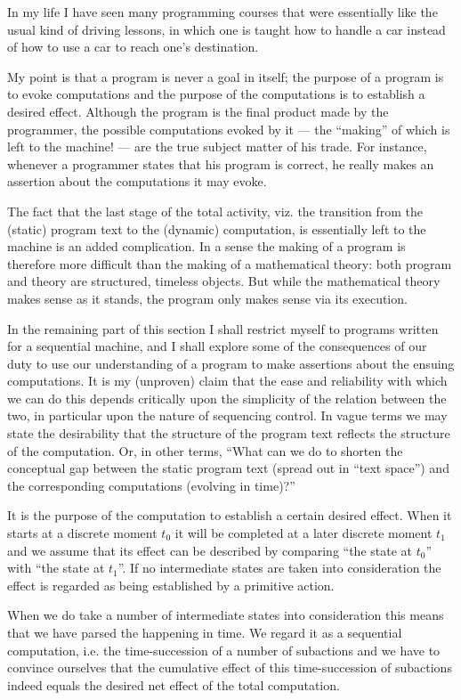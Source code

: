 In my life I have seen many programming courses that were essentially like the usual kind of driving lessons, in which one is taught how to handle a car
instead of how to use a car to reach one's destination.

My point is that a program is never a goal in itself; the purpose of a program is to evoke computations and the purpose of the computations is to establish a desired effect. Although the program is the final product made by the programmer, the possible computations evoked by it --- the ``making'' of which is left to the machine! --- are the true subject matter of his trade. For instance, whenever a programmer states that his program is correct, he really makes an assertion about the computations it may evoke.

The fact that the last stage of the total activity, viz. the transition from the (static) program text to the (dynamic) computation, is essentially left to the machine is an added complication. In a sense the making of a program is therefore more difficult than the making of a mathematical theory: both program and theory are structured, timeless objects. But while the mathematical theory makes sense as it stands, the program only makes sense via its execution.

In the remaining part of this section I shall restrict myself to programs written for a sequential machine, and I shall explore some of the consequences of our duty to use our understanding of a program to make assertions about the ensuing computations. It is my (unproven) claim that the ease and reliability with which we can do this depends critically upon the simplicity of the relation between the two, in particular upon the nature of sequencing control. In vague terms we may state the desirability that the structure of the program text reflects the structure of the computation. Or, in other terms, ``What can we do to shorten the conceptual gap between the static program
text (spread out in ``text space'') and the corresponding computations (evolving in time)?''

It is the purpose of the computation to establish a certain desired effect. When it starts at a discrete moment $t_0$ it will be completed at a later discrete moment $t_1$ and we assume that its effect can be described by comparing ``the state at $t_0$'' with ``the state at $t_1$''. If no intermediate states are taken into consideration the effect is regarded as being established by a primitive action.

When we do take a number of intermediate states into consideration this means that we have parsed the happening in time. We regard it as a sequential computation, i.e. the time-succession of a number of subactions and we have to convince ourselves that the cumulative effect of this time-succession of subactions indeed equals the desired net effect of the total computation.

